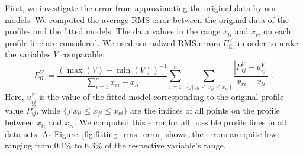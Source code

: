 First, we investigate the error from approximating the original data by our
models. We computed the average \ac{RMS} error between the
original data of the profiles and the fitted models. The data values in the
range $x_{li}$ and $x_{ri}$ on each profile line are considered.
%
%
We used normalized \ac{RMS} errors $E^V_{\text{fit}}$ in order to make the
variables $V$ comparable:
%
%
\begin{equation*}
	E^V_{\text{fit}} 
		= 	\frac{(\max(V)-\min(V))^{-1}}{\sum_{i=1}^n x_{ri}-x_{li}} 
			\sum_{i=1}^n~
			\sum_{\{j | x_{li} \leq x_{ji} \leq x_{ri}\}}
						\frac{|P_{ij}^V-u_{ij}^V|}
							{x_{ri}-x_{li}} 
	\text{ .}
\end{equation*}
%
Here, $u_{ij}^V$ is the value of the fitted model corresponding to the original
profile value $P_{ij}^V$, while $\{j | x_{li} \leq x_{ji} \leq x_{ri}\}$ are the
indices of all points on the profile between $x_{li}$ and $x_{ri}$. We computed
this error for all possible profile lines in all data sets.
% 
%
As Figure~\ref{fig:fitting_rms_error} shows, the errors are quite low, ranging
from 0.1\% to 6.3\% of the respective variable's range.

